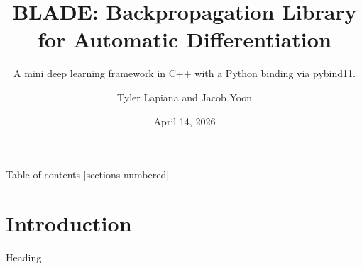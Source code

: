 \documentclass[9pt, aspectratio=169]{beamer}
\title{BLADE: Backpropagation Library for Automatic Differentiation}
\subtitle{A mini deep learning framework in C++ with a Python binding via pybind11.}
\date{April 14, 2026}
\author{Tyler Lapiana and Jacob Yoon}
\institute{Rochester Institute of Technology}
\begin{document}
\maketitle

\begin{frame}{Table of contents}
  [sections numbered]
  \tableofcontents
\end{frame}

\section{Introduction}

\begin{frame}{Heading}
\end{frame}

%   
%   
\end{document}
